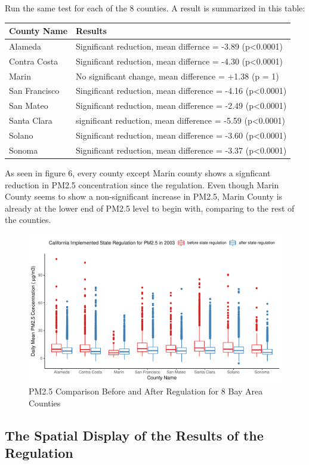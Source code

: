 \documentclass[12pt,]{article}
\begin{document}
Run the same test for each of the 8 counties. A result is summarized in
this table:

\begin{longtable}[]{@{}ll@{}}
\toprule
County Name & Results\tabularnewline
\midrule
\endhead
Alameda & Significant reduction, mean differnce = -3.89
(p\textless{}0.0001)\tabularnewline
Contra Costa & Significant reduction, mean differnce = -4.30
(p\textless{}0.0001)\tabularnewline
Marin & No significant change, mean difference = +1.38 (p =
1)\tabularnewline
San Francisco & Singificant reduction, mean difference = -4.16
(p\textless{}0.0001)\tabularnewline
San Mateo & Significant reduction, mean difference = -2.49
(p\textless{}0.0001)\tabularnewline
Santa Clara & significant reduction, mean difference = -5.59
(p\textless{}0.0001)\tabularnewline
Solano & Significant reduction, mean difference = -3.60
(p\textless{}0.0001)\tabularnewline
Sonoma & Significant reduction, mean difference = -3.37
(p\textless{}0.0001)\tabularnewline
\bottomrule
\end{longtable}

As seen in figure 6, every county except Marin county shows a signficant
reduction in PM2.5 concentration since the regulation. Even though Marin
County seems to show a non-significant increase in PM2.5, Marin County
is already at the lower end of PM2.5 level to begin with, comparing to
the rest of the counties.

\begin{figure}
\centering
\includegraphics{pm25_files/figure-latex/unnamed-chunk-7-1.pdf}
\caption{PM2.5 Comparison Before and After Regulation for 8 Bay Area
Counties}
\end{figure}

\newpage

\subsection{The Spatial Display of the Results of the
Regulation}\label{the-spatial-display-of-the-results-of-the-regulation}
\end{document}
